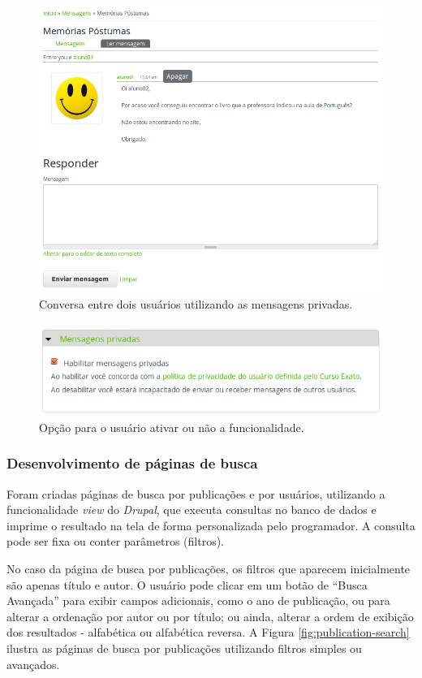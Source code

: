 \documentclass[a4paper]{article}
\begin{document}
\begin{figure}[pbth!]
\centering
\includegraphics[width=120mm]{img/privatemsg.png}
\caption{Conversa entre dois usuários utilizando as mensagens privadas.\label{privatemsg}}
\end{figure}

\begin{figure}[pbth!]
\centering
\includegraphics[width=120mm]{img/privatemsg-config.png}
\caption{Opção para o usuário ativar ou não a funcionalidade.\label{pvtmsg-config}}
\end{figure}


\subsubsection{Desenvolvimento de páginas de busca}

Foram criadas páginas de busca por publicações e por usuários, utilizando a funcionalidade \textit{view} do \textit{Drupal}, que executa consultas no banco de dados e imprime o resultado na tela de forma personalizada pelo programador. A consulta pode ser fixa ou conter parâmetros (filtros). 

No caso da página de busca por publicações, os filtros que aparecem inicialmente são apenas título e autor. O usuário pode clicar em um botão de “Busca Avançada” para exibir campos adicionais, como o ano de publicação, ou para alterar a ordenação por autor ou por título; ou ainda, alterar a ordem de exibição dos resultados - alfabética ou alfabética reversa. A Figura \ref{fig:publication-search} ilustra as páginas de busca por publicações utilizando filtros simples ou avançados.
\end{document}
